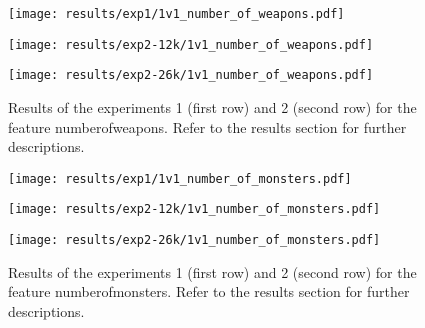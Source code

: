 \begin{figure}[h!]
	\centering
	\begin{minipage}{0.4\linewidth}
		\texttt{[image: results/exp1/1v1\_number\_of\_weapons.pdf]}
	\end{minipage}
	
	\begin{minipage}{0.4\linewidth}
		\texttt{[image: results/exp2-12k/1v1\_number\_of\_weapons.pdf]}
	\end{minipage}
	\begin{minipage}{0.4\linewidth}
		\texttt{[image: results/exp2-26k/1v1\_number\_of\_weapons.pdf]}
	\end{minipage}
	
	\caption[ Results: Feature number\textunderscore of\textunderscore weapons]{ Results of the experiments 1 (first row) and 2 (second row) for the feature number\textunderscore of\textunderscore weapons. Refer to the results section for further descriptions. }
	\label{fig:appendix_number_of_weapons}
\end{figure}
\newpage 


\begin{figure}[h!]
	\centering
	\begin{minipage}{0.4\linewidth}
		\texttt{[image: results/exp1/1v1\_number\_of\_monsters.pdf]}
	\end{minipage}
	
	\begin{minipage}{0.4\linewidth}
		\texttt{[image: results/exp2-12k/1v1\_number\_of\_monsters.pdf]}
	\end{minipage}
	\begin{minipage}{0.4\linewidth}
		\texttt{[image: results/exp2-26k/1v1\_number\_of\_monsters.pdf]}
	\end{minipage}
	
	\caption[ Results: Feature number\textunderscore of\textunderscore monsters]{ Results of the experiments 1 (first row) and 2 (second row) for the feature number\textunderscore of\textunderscore monsters. Refer to the results section for further descriptions. }
	\label{fig:appendix_number_of_monsters}
\end{figure}

